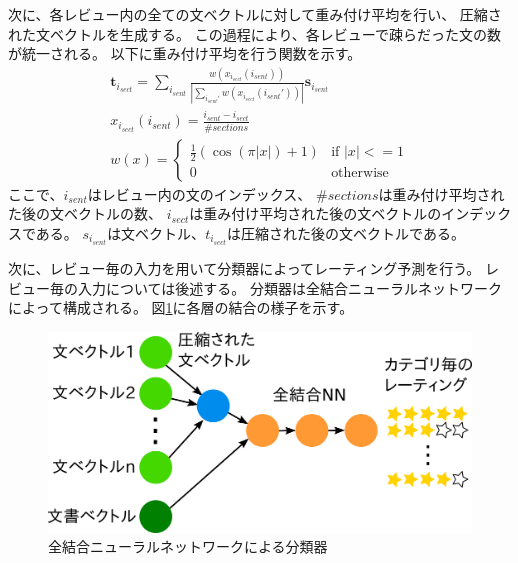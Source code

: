 \documentclass[twocolumn,a4paper]{ltjarticle}
\makeatletter
\let\tti@includegraphics\includegraphics
\renewcommand{\includegraphics}[1]{%
    \tti@includegraphics[width=\linewidth]{#1}}
\makeatother
\begin{document}
次に、各レビュー内の全ての文ベクトルに対して重み付け平均を行い、
圧縮された文ベクトルを生成する。
この過程により、各レビューで疎らだった文の数が統一される。
以下に重み付け平均を行う関数を示す。
\begin{gather}
  \mathbf{t}_{i_{sect}} = \sum_{i_{sent}}
                          \frac{w(x_{i_{sect}}(i_{sent}))}
                               {|\sum_{i_{sent}'} w(x_{i_{sect}}(i_{sent}'))|}
                          \mathbf{s}_{i_{sent}} \\
  x_{i_{sect}}(i_{sent}) = \frac{i_{sent} - i_{sect}}{\#sections} \\
  w(x) = \begin{cases}
    \frac{1}{2} (\cos(\pi|x|) + 1) &\text{if $|x| <= 1$} \\
    0 &\text{otherwise}
  \end{cases}
\end{gather}
ここで、$i_{sent}$はレビュー内の文のインデックス、
$\#sections$は重み付け平均された後の文ベクトルの数、
$i_{sect}$は重み付け平均された後の文ベクトルのインデックスである。
$s_{i_{sent}}$は文ベクトル、$t_{i_{sect}}$は圧縮された後の文ベクトルである。

次に、レビュー毎の入力を用いて分類器によってレーティング予測を行う。
レビュー毎の入力については後述する。
分類器は全結合ニューラルネットワークによって構成される。
図\ref{fig:MyModel}に各層の結合の様子を示す。

\begin{figure}[t]
  \includegraphics{fig/model.png}
  \caption{全結合ニューラルネットワークによる分類器}
  \label{fig:MyModel}
\end{figure}
\end{document}
